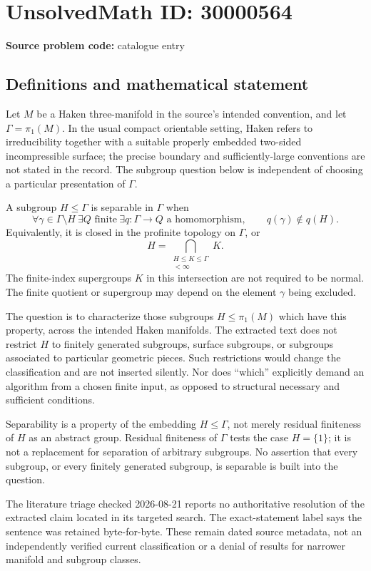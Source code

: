 \documentclass[11pt]{article}
\begin{document}
\section*{UnsolvedMath ID: 30000564}
\textbf{Source problem code:} catalogue entry
\subsection{Definitions and mathematical statement}
Let \(M\) be a Haken three-manifold in the source's intended convention, and let \(\Gamma=\pi_1(M)\). In the usual compact orientable setting, Haken refers to irreducibility together with a suitable properly embedded two-sided incompressible surface; the precise boundary and sufficiently-large conventions are not stated in the record. The subgroup question below is independent of choosing a particular presentation of \(\Gamma\).

A subgroup \(H\leq\Gamma\) is separable in \(\Gamma\) when
\[
 \forall\gamma\in\Gamma\setminus H\ \exists Q\text{ finite}\ \exists q:\Gamma\to Q
 \text{ a homomorphism},\qquad q(\gamma)\notin q(H).
\]
Equivalently, it is closed in the profinite topology on \(\Gamma\), or
\[
 H=\bigcap_{\substack{H\leq K\leq\Gamma\\[\Gamma:K]<\infty}}K.
\]
The finite-index supergroups \(K\) in this intersection are not required to be normal. The finite quotient or supergroup may depend on the element \(\gamma\) being excluded.

The question is to characterize those subgroups \(H\leq\pi_1(M)\) which have this property, across the intended Haken manifolds. The extracted text does not restrict \(H\) to finitely generated subgroups, surface subgroups, or subgroups associated to particular geometric pieces. Such restrictions would change the classification and are not inserted silently. Nor does ``which'' explicitly demand an algorithm from a chosen finite input, as opposed to structural necessary and sufficient conditions.

Separability is a property of the embedding \(H\leq\Gamma\), not merely residual finiteness of \(H\) as an abstract group. Residual finiteness of \(\Gamma\) tests the case \(H=\{1\}\); it is not a replacement for separation of arbitrary subgroups. No assertion that every subgroup, or every finitely generated subgroup, is separable is built into the question.

The literature triage checked 2026-08-21 reports no authoritative resolution of the extracted claim located in its targeted search. The exact-statement label says the sentence was retained byte-for-byte. These remain dated source metadata, not an independently verified current classification or a denial of results for narrower manifold and subgroup classes.
\end{document}
